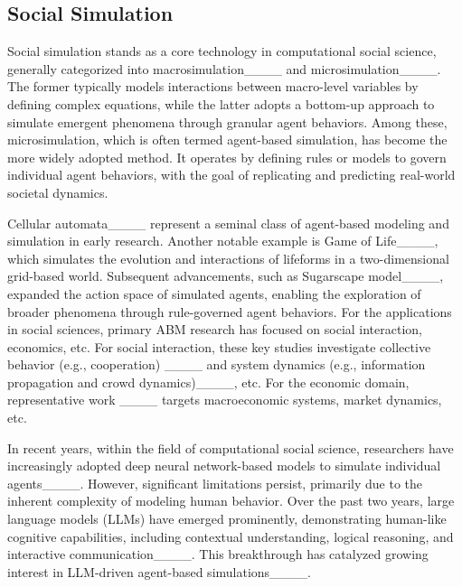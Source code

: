 

\subsection{Social Simulation}
Social simulation stands as a core technology in computational social science, generally categorized into macrosimulation____ and microsimulation____. The former typically models interactions between macro-level variables by defining complex equations, while the latter adopts a bottom-up approach to simulate emergent phenomena through granular agent behaviors. Among these, microsimulation, which is often termed agent-based simulation, has become the more widely adopted method. It operates by defining rules or models to govern individual agent behaviors, with the goal of replicating and predicting real-world societal dynamics.


Cellular automata____ represent a seminal class of agent-based modeling and simulation in early research. Another notable example is Game of Life____, which simulates the evolution and interactions of lifeforms in a two-dimensional grid-based world. Subsequent advancements, such as Sugarscape model____, expanded the action space of simulated agents, enabling the exploration of broader phenomena through rule-governed agent behaviors.  For the applications in social sciences, primary ABM research has focused on social interaction, economics, etc. For social interaction, these key studies investigate collective behavior (e.g., cooperation) ____ and system dynamics (e.g., information propagation and crowd dynamics)____, etc. For the economic domain, representative work ____ targets macroeconomic systems, market dynamics, etc.

In recent years, within the field of computational social science, researchers have increasingly adopted deep neural network-based models to simulate individual agents____. However, significant limitations persist, primarily due to the inherent complexity of modeling human behavior.  Over the past two years, large language models (LLMs) have emerged prominently, demonstrating human-like cognitive capabilities, including contextual understanding, logical reasoning, and interactive communication____. This breakthrough has catalyzed growing interest in LLM-driven agent-based simulations____.  

